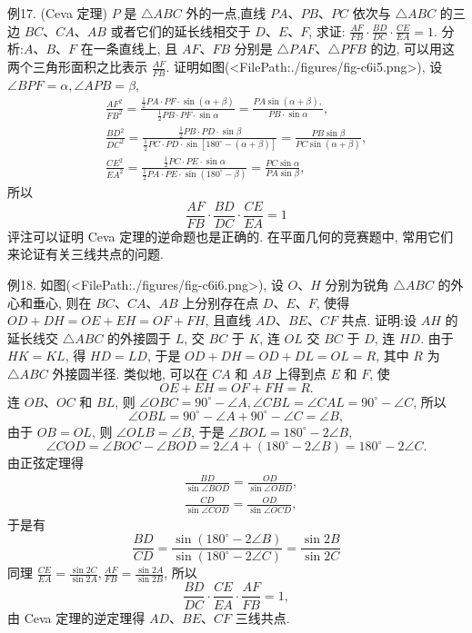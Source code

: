 例17. (Ceva 定理) $P$ 是 $\triangle A B C$ 外的一点,直线 $P A 、 P B 、 P C$ 依次与 $\triangle A B C$ 的三边 $B C 、 C A 、 A B$ 或者它们的延长线相交于 $D 、 E 、 F$, 求证: $\frac{A F}{F B} \cdot \frac{B D}{D C} \cdot \frac{C E}{E A}=1$.
分析:$A 、 B 、 F$ 在一条直线上, 且 $A F 、 F B$ 分别是 $\triangle P A F 、 \triangle P F B$ 的边, 可以用这两个三角形面积之比表示 $\frac{A F}{F B}$.
证明如图(<FilePath:./figures/fig-c6i5.png>), 设 $\angle B P F=\alpha, \angle A P B=\beta$,
$$
\begin{gathered}
\frac{A F^2}{F B^2}=\frac{\frac{1}{2} P A \cdot P F \cdot \sin (\alpha+\beta)}{\frac{1}{2} P B \cdot P F \cdot \sin \alpha}=\frac{P A \sin (\alpha+\beta),}{P B \cdot \sin \alpha}, \\
\frac{B D^2}{D C^2}=\frac{\frac{1}{2} P B \cdot P D \cdot \sin \beta}{\frac{1}{2} P C \cdot P D \cdot \sin \left[180^{\circ}-(\alpha+\beta)\right]}=\frac{P B \sin \beta}{P C \sin (\alpha+\beta)}, \\
\frac{C E^2}{E A^2}=\frac{\frac{1}{2} P C \cdot P E \cdot \sin \alpha}{\frac{1}{2} P A \cdot P E \cdot \sin \left(180^{\circ}-\beta\right)}=\frac{P C \sin \alpha}{P A \sin \beta},
\end{gathered}
$$
所以
$$
\frac{A F}{F B} \cdot \frac{B D}{D C} \cdot \frac{C E}{E A}=1
$$
评注可以证明 Ceva 定理的逆命题也是正确的.
在平面几何的竞赛题中, 常用它们来论证有关三线共点的问题.



例18. 如图(<FilePath:./figures/fig-c6i6.png>), 设 $O 、 H$ 分别为锐角 $\triangle A B C$ 的外心和垂心, 则在 $B C 、 C A 、 A B$ 上分别存在点 $D 、 E 、 F$, 使得 $O D+D H=O E+E H=O F+F H$, 且直线 $A D 、 B E 、 C F$ 共点.
证明:设 $A H$ 的延长线交 $\triangle A B C$ 的外接圆于 $L$, 交 $B C$ 于 $K$, 连 $O L$ 交 $B C$ 于 $D$, 连 $H D$. 由于 $H K=K L$, 得 $H D=L D$, 于是 $O D+D H=O D+ D L=O L=R$, 其中 $R$ 为 $\triangle A B C$ 外接圆半径.
类似地, 可以在 $C A$ 和 $A B$ 上得到点 $E$ 和 $F$, 使
$$
O E+E H=O F+F H=R .
$$
连 $O B 、 O C$ 和 $B L$, 则 $\angle O B C=90^{\circ}-\angle A, \angle C B L=\angle C A L=90^{\circ}- \angle C$, 所以
$$
\angle O B L=90^{\circ}-\angle A+90^{\circ}-\angle C=\angle B,
$$
由于 $O B=O L$, 则 $\angle O L B=\angle B$, 于是 $\angle B O L=180^{\circ}-2 \angle B$,
$$
\angle C O D=\angle B O C-\angle B O D=2 \angle A+\left(180^{\circ}-2 \angle B\right)=180^{\circ}-2 \angle C .
$$
由正弦定理得
$$
\begin{aligned}
& \frac{B D}{\sin \angle B O D}=\frac{O D}{\sin \angle O B D}, \\
& \frac{C D}{\sin \angle C O D}=\frac{O D}{\sin \angle O C D},
\end{aligned}
$$
于是有
$$
\frac{B D}{C D}=\frac{\sin \left(180^{\circ}-2 \angle B\right)}{\sin \left(180^{\circ}-2 \angle C\right)}=\frac{\sin 2 B}{\sin 2 C}
$$
同理 $\frac{C E}{E A}=\frac{\sin 2 C}{\sin 2 A}, \frac{A F}{F B}=\frac{\sin 2 A}{\sin 2 B}$, 所以
$$
\frac{B D}{D C} \cdot \frac{C E}{E A} \cdot \frac{A F}{F B}=1,
$$
由 Ceva 定理的逆定理得 $A D 、 B E 、 C F$ 三线共点.



